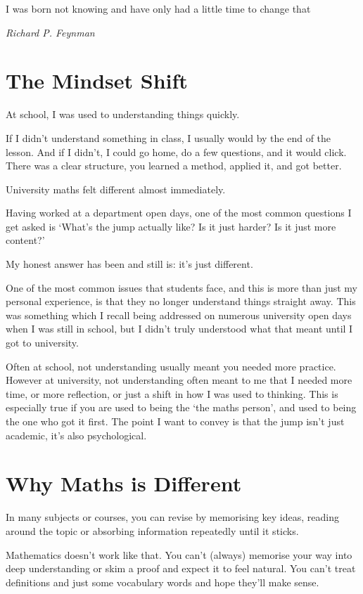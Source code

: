 \epigraph{I was born not knowing and have only had a little time to change that}
{\textit{Richard P. Feynman}}

\section{The Mindset Shift}

At school, I was used to understanding things quickly. 

If I didn't understand something in class, I usually would by the end of the lesson. And if I didn't, I could go home, do a few questions, and it would click. There was a clear structure, you learned a method, applied it, and got better. 

University maths felt different almost immediately. 

Having worked at a department open days, one of the most common questions I get asked is `What's the jump actually like? Is it just harder? Is it just more content?' 

My honest answer has been and still is: it's just different. 

One of the most common issues that students face, and this is more than just my personal experience, is that they no longer understand things straight away. This was something which I recall being addressed on numerous university open days when I was still in school, but I didn't truly understood what that meant until I got to university. 

Often at school, not understanding usually meant you needed more practice. However at university, not understanding often meant to me that I needed more time, or more reflection, or just a shift in how I was used to thinking. This is especially true if you are used to being the `the maths person', and used to being the one who got it first. The point I want to convey is that the jump isn't just academic, it's also psychological. 

\section{Why Maths is Different}

In many subjects or courses, you can revise by memorising key ideas, reading around the topic or absorbing information repeatedly until it sticks. 

Mathematics doesn't work like that. You can't (always) memorise your way into deep understanding or skim a proof and expect it to feel natural. You can't treat definitions and just some vocabulary words and hope they'll make sense. 


